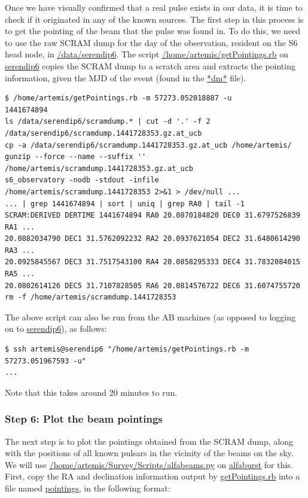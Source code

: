 \documentclass{article}
\begin{document}
Once we have visually confirmed that a real pulse exists in our data, it is
time to check if it originated in any of the known sources. The first step in
this process is to get the pointing of the beam that the pulse was found in. To
do this, we need to use the raw SCRAM dump for the day of the observation,
resident on the S6 head node, in \url{/data/serendip6}. The script
\url{/home/artemis/getPointings.rb} on \url{serendip6} copies the SCRAM dump to
a scratch area and extracts the pointing information, given the MJD of the
event (found in the \url{*dm*} file).

\small{
\begin{verbatim}
$ /home/artemis/getPointings.rb -m 57273.052018887 -u
1441674894
ls /data/serendip6/scramdump.* | cut -d '.' -f 2
/data/serendip6/scramdump.1441728353.gz.at_ucb
cp -a /data/serendip6/scramdump.1441728353.gz.at_ucb /home/artemis/
gunzip --force --name --suffix '' /home/artemis/scramdump.1441728353.gz.at_ucb
s6_observatory -nodb -stdout -infile /home/artemis/scramdump.1441728353 2>&1 > /dev/null ...
... | grep 1441674894 | sort | uniq | grep RA0 | tail -1
SCRAM:DERIVED DERTIME 1441674894 RA0 20.0870184820 DEC0 31.6797526839 RA1 ...
20.0882034790 DEC1 31.5762092232 RA2 20.0937621054 DEC2 31.6480614290 RA3 ...
20.0925845567 DEC3 31.7517543100 RA4 20.0858295333 DEC4 31.7832084015 RA5 ...
20.0802614126 DEC5 31.7107828505 RA6 20.0814576722 DEC6 31.6074755720
rm -f /home/artemis/scramdump.1441728353
\end{verbatim}
}

The above script can also be run from the AB machines (as opposed to logging on
to \url{serendip6}), as follows:

\small{
\begin{verbatim}
$ ssh artemis@serendip6 "/home/artemis/getPointings.rb -m 57273.051967593 -u"
...
\end{verbatim}
}

Note that this takes around 20 minutes to run.


\subsubsection*{Step 6: Plot the beam pointings}

The next step is to plot the pointings obtained from the SCRAM dump, along with
the positions of all known pulsars in the vicinity of the beams on the sky. We
will use \url{/home/artemis/Survey/Scripts/alfabeams.py} on \url{alfaburst} for
this. First, copy the RA and declination information output by
\url{getPointings.rb} into a file named \url{pointings}, in the following
format:
\end{document}
